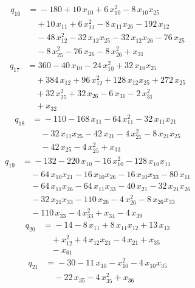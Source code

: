 \documentclass[11pt]{article}
\theoremstyle{remark}\newtheorem{remark}[theorem]{Remark}
\begin{document}
\begin{align*}
q_{16} &={}-180 +10\,x_{10} +6\,x_{10}^{2} -8\,x_{10}x_{25}\\
&\quad +10\,x_{11} +6\,x_{11}^{2} -8\,x_{11}x_{26} -192\,x_{12}\\
&\quad -48\,x_{12}^{2} -32\,x_{12}x_{25} -32\,x_{12}x_{26} -76\,x_{25}\\
&\quad -8\,x_{25}^{2} -76\,x_{26} -8\,x_{26}^{2} +x_{31}
\end{align*}
\begin{align*}
q_{17} &={}360 -40\,x_{10} -24\,x_{10}^{2} +32\,x_{10}x_{25}\\
&\quad +384\,x_{12} +96\,x_{12}^{2} +128\,x_{12}x_{25} +272\,x_{25}\\
&\quad +32\,x_{25}^{2} +32\,x_{26} -6\,x_{31} -2\,x_{31}^{2}\\
&\quad +x_{32}
\end{align*}
\begin{align*}
q_{18} &={}-110 -168\,x_{11} -64\,x_{11}^{2} -32\,x_{11}x_{21}\\
&\quad -32\,x_{11}x_{25} -42\,x_{21} -4\,x_{21}^{2} -8\,x_{21}x_{25}\\
&\quad -42\,x_{25} -4\,x_{25}^{2} +x_{33}
\end{align*}
\begin{align*}
q_{19} &={}-132 -220\,x_{10} -16\,x_{10}^{2} -128\,x_{10}x_{11}\\
&\quad -64\,x_{10}x_{21} -16\,x_{10}x_{26} -16\,x_{10}x_{33} -80\,x_{11}\\
&\quad -64\,x_{11}x_{26} -64\,x_{11}x_{33} -40\,x_{21} -32\,x_{21}x_{26}\\
&\quad -32\,x_{21}x_{33} -110\,x_{26} -4\,x_{26}^{2} -8\,x_{26}x_{33}\\
&\quad -110\,x_{33} -4\,x_{33}^{2} +x_{34} -4\,x_{39}
\end{align*}
\begin{align*}
q_{20} &={}-14 -8\,x_{11} +8\,x_{11}x_{12} +13\,x_{12}\\
&\quad +x_{12}^{2} +4\,x_{12}x_{21} -4\,x_{21} +x_{35}\\
&\quad -x_{61}
\end{align*}
\begin{align*}
q_{21} &={}-30 -11\,x_{10} -x_{10}^{2} -4\,x_{10}x_{35}\\
&\quad -22\,x_{35} -4\,x_{35}^{2} +x_{36}
\end{align*}
\end{document}
